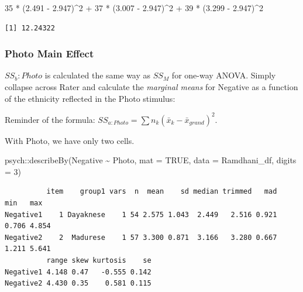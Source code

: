 \documentclass[
  11pt,
]{book}
\newenvironment{Shaded}{\begin{snugshade}}{\end{snugshade}}
\newcommand{\AttributeTok}[1]{\textcolor[rgb]{0.77,0.63,0.00}{#1}}
\newcommand{\ConstantTok}[1]{\textcolor[rgb]{0.00,0.00,0.00}{#1}}
\newcommand{\DecValTok}[1]{\textcolor[rgb]{0.00,0.00,0.81}{#1}}
\newcommand{\FloatTok}[1]{\textcolor[rgb]{0.00,0.00,0.81}{#1}}
\newcommand{\FunctionTok}[1]{\textcolor[rgb]{0.00,0.00,0.00}{#1}}
\newcommand{\NormalTok}[1]{#1}
\newcommand{\SpecialCharTok}[1]{\textcolor[rgb]{0.00,0.00,0.00}{#1}}
\begin{document}
\begin{Shaded}
\begin{Highlighting}[]
\DecValTok{35} \SpecialCharTok{*}\NormalTok{ (}\FloatTok{2.491} \SpecialCharTok{{-}} \FloatTok{2.947}\NormalTok{)}\SpecialCharTok{\^{}}\DecValTok{2} \SpecialCharTok{+} \DecValTok{37} \SpecialCharTok{*}\NormalTok{ (}\FloatTok{3.007} \SpecialCharTok{{-}} \FloatTok{2.947}\NormalTok{)}\SpecialCharTok{\^{}}\DecValTok{2} \SpecialCharTok{+} \DecValTok{39} \SpecialCharTok{*}\NormalTok{ (}\FloatTok{3.299} \SpecialCharTok{{-}} \FloatTok{2.947}\NormalTok{)}\SpecialCharTok{\^{}}\DecValTok{2}
\end{Highlighting}
\end{Shaded}

\begin{verbatim}
[1] 12.24322
\end{verbatim}

\hypertarget{photo-main-effect}{%
\subsubsection{Photo Main Effect}\label{photo-main-effect}}

\(SS_b:Photo\) is calculated the same way as \(SS_M\) for one-way ANOVA. Simply collapse across Rater and calculate the \emph{marginal means} for Negative as a function of the ethnicity reflected in the Photo stimulus:

Reminder of the formula: \(SS_{a:Photo}= \sum n_{k}(\bar{x}_{k}-\bar{x}_{grand})^{2}\).

With Photo, we have only two cells.

\begin{Shaded}
\begin{Highlighting}[]
\NormalTok{psych}\SpecialCharTok{::}\FunctionTok{describeBy}\NormalTok{(Negative }\SpecialCharTok{\textasciitilde{}}\NormalTok{ Photo, }\AttributeTok{mat =} \ConstantTok{TRUE}\NormalTok{, }\AttributeTok{data =}\NormalTok{ Ramdhani\_df, }\AttributeTok{digits =} \DecValTok{3}\NormalTok{)}
\end{Highlighting}
\end{Shaded}

\begin{verbatim}
          item    group1 vars  n  mean    sd median trimmed   mad   min   max
Negative1    1 Dayaknese    1 54 2.575 1.043  2.449   2.516 0.921 0.706 4.854
Negative2    2  Madurese    1 57 3.300 0.871  3.166   3.280 0.667 1.211 5.641
          range skew kurtosis    se
Negative1 4.148 0.47   -0.555 0.142
Negative2 4.430 0.35    0.581 0.115
\end{verbatim}
\end{document}
